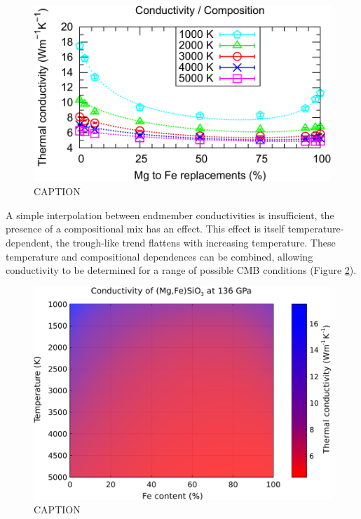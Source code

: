 \begin{figure}[h!]
  \includegraphics[width=\linewidth]{Figures/k-c_all_01.png}
  \caption{CAPTION}
  \label{fig:kappa-comp_01}
\end{figure}

A simple interpolation between endmember conductivities is insufficient, the presence of a compositional mix has an effect. This effect is itself temperature-dependent, the trough-like trend flattens with increasing temperature. These temperature and compositional dependences can be combined, allowing conductivity to be determined for a range of possible CMB conditions (Figure \ref{fig:kappa-temp-comp_01}). 

\begin{figure}[h!]
  \includegraphics[width=\linewidth]{Figures/K_over_T_over_X.png}
  \caption{CAPTION}
  \label{fig:kappa-temp-comp_01}
\end{figure}



